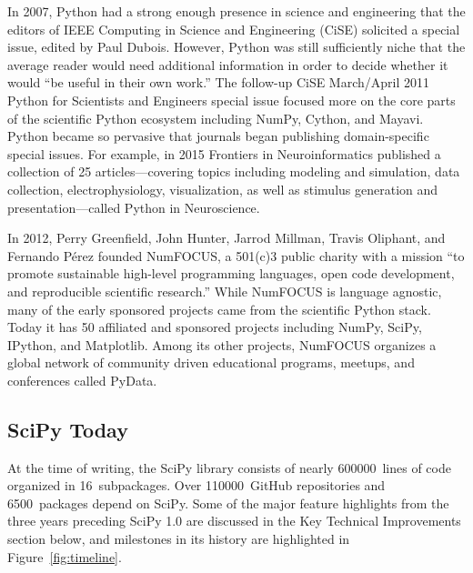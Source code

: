 \documentclass[fleqn,10pt]{wlscirep}
\begin{document}
In 2007, Python had a strong enough presence in science and engineering
that the editors of IEEE Computing in Science and Engineering
(CiSE) solicited a special issue\cite{dubois2007guest}, edited by Paul
Dubois. However, Python was still sufficiently niche that the average reader
would need additional information in order to decide whether it would
``be useful in their own work.''
The follow-up CiSE March/April 2011 Python for Scientists and Engineers
special issue\cite{millman2011python} focused more on the core parts
of the scientific Python ecosystem\cite{perez2011python} including
NumPy\cite{vanderwalt2011numpy}, Cython\cite{behnel2011cython},
and Mayavi\cite{ramachandran2011mayavi}. Python became so pervasive that
journals began publishing domain-specific special issues.
For example, in 2015 Frontiers in Neuroinformatics published a collection of 25 articles---covering
topics including modeling and simulation, data collection, electrophysiology, visualization,
as well as stimulus generation and presentation---called Python in
Neuroscience\cite{python-FIN}.

In 2012, Perry Greenfield, John Hunter, Jarrod Millman, Travis Oliphant,
and Fernando Pérez founded NumFOCUS\cite{numfocus},
 a 501(c)3 public charity with a mission
``to promote sustainable high-level programming languages, open code development,
and reproducible scientific research.''
While NumFOCUS is language agnostic, many of the early sponsored projects
came from the scientific Python stack.
Today it has 50 affiliated and sponsored projects including NumPy, SciPy, IPython, and
Matplotlib.
Among its other projects, NumFOCUS organizes a global network of
community driven educational programs, meetups, and conferences
called PyData.

\subsection*{SciPy Today}
At the time of writing, the SciPy library consists of nearly
\num{600000}~lines of code organized in 16~subpackages.
Over \num{110000}~GitHub repositories and \num{6500}~packages depend
on SciPy\cite{dependents}. Some of the major
feature highlights from the three years preceding
SciPy 1.0 are discussed in the Key Technical Improvements section below,
and milestones in its history are highlighted in Figure~\ref{fig:timeline}.
\end{document}
